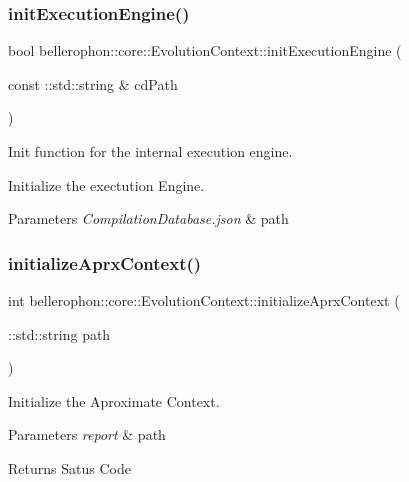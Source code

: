 \subsubsection{\texorpdfstring{init\+Execution\+Engine()}{initExecutionEngine()}}
{\footnotesize\ttfamily bool bellerophon\+::core\+::\+Evolution\+Context\+::init\+Execution\+Engine (\begin{DoxyParamCaption}\item[{const \+::std\+::string \&}]{cd\+Path }\end{DoxyParamCaption})}



Init function for the internal execution engine. 

Initialize the exectution Engine.


\begin{DoxyParams}{Parameters}
{\em Compilation\+Database.\+json} & path \\
\hline
\end{DoxyParams}
\hypertarget{classbellerophon_1_1core_1_1EvolutionContext_a13906d3491e042f84473f0b10283acdd}{}\label{classbellerophon_1_1core_1_1EvolutionContext_a13906d3491e042f84473f0b10283acdd} 
\subsubsection{\texorpdfstring{initialize\+Aprx\+Context()}{initializeAprxContext()}}
{\footnotesize\ttfamily int bellerophon\+::core\+::\+Evolution\+Context\+::initialize\+Aprx\+Context (\begin{DoxyParamCaption}\item[{\+::std\+::string}]{path }\end{DoxyParamCaption})}



Initialize the Aproximate Context. 


\begin{DoxyParams}{Parameters}
{\em report} & path \\
\hline
\end{DoxyParams}
\begin{DoxyReturn}{Returns}
Satus Code 
\end{DoxyReturn}
\hypertarget{classbellerophon_1_1core_1_1EvolutionContext_ad21ec88b2a31a98140b052dcb0352cc9}{}\label{classbellerophon_1_1core_1_1EvolutionContext_ad21ec88b2a31a98140b052dcb0352cc9} 

